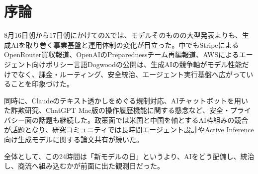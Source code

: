 \section{序論}
8月16日朝から17日朝にかけてのXでは、モデルそのものの大型発表よりも、生成AIを取り巻く事業基盤と運用体制の変化が目立った。中でもStripeによるOpenRouter買収報道、OpenAIのPreparednessチーム再編報道、AWSによるエージェント向けポリシー言語Dogwoodの公開は、生成AIの競争軸がモデル性能だけでなく、課金・ルーティング、安全統治、エージェント実行基盤へ広がっていることを印象づけた。

同時に、Claudeのテキスト透かしをめぐる規制対応、AIチャットボットを用いた詐欺研究、ChatGPT Mac版の操作履歴機能に関する懸念など、安全・プライバシー面の話題も継続した。政策面では米国と中国を軸とするAI枠組みの競合が話題となり、研究コミュニティでは長時間エージェント設計やActive Inference向け生成モデルに関する論文共有が続いた。

全体として、この24時間は「新モデルの日」というより、AIをどう配備し、統治し、商流へ組み込むかが前面に出た観測日だった。
